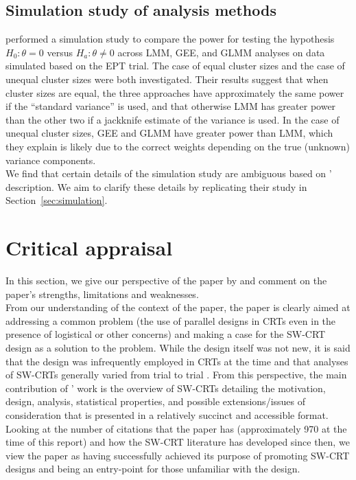 \documentclass[10pt]{article}
\begin{document}
\subsection{Simulation study of analysis methods}

\textcite{Hussey:2007} performed a simulation study to compare the power for testing the hypothesis $H_0:\theta=0$ versus $H_a:\theta\neq0$ across LMM, GEE, and GLMM analyses on data simulated based on the EPT trial. The case of equal cluster sizes and the case of unequal cluster sizes were both investigated. Their results suggest that when cluster sizes are equal, the three approaches have approximately the same power  if the ``standard variance'' is used, and that otherwise LMM has greater power than the other two if a jackknife estimate of the variance is used. In the case of unequal cluster sizes, GEE and GLMM have greater power than LMM, which they explain is likely due to the correct weights depending on the true (unknown) variance components.
\\

We find that certain details of the simulation study are ambiguous based on \citeauthor{Hussey:2007}' description. We aim to clarify these details by replicating their study in Section~\ref{sec:simulation}.


\section{Critical appraisal} \label{sec:critique}

In this section, we give our perspective of the paper by \textcite{Hussey:2007} and comment on the paper's strengths, limitations and weaknesses.
\\

From our understanding of the context of the paper, the paper is clearly aimed at addressing a common problem (the use of parallel designs in CRTs even in the presence of logistical or other concerns) and making a case for the SW-CRT design as a solution to the problem. While the design itself was not new, it is said that the design was infrequently employed in CRTs at the time and that analyses of SW-CRTs generally varied from trial to trial \parencite{Brown:2006}. From this perspective, the main contribution of \citeauthor{Hussey:2007}' work is the overview of SW-CRTs detailing the motivation, design, analysis, statistical properties, and possible extensions/issues of consideration that is presented in a relatively succinct and accessible format. Looking at the number of citations that the paper has (approximately 970 at the time of this report) and how the SW-CRT literature has developed since then, we view the paper as having successfully achieved its purpose of promoting SW-CRT designs and being an entry-point for those unfamiliar with the design.
\\
\end{document}
